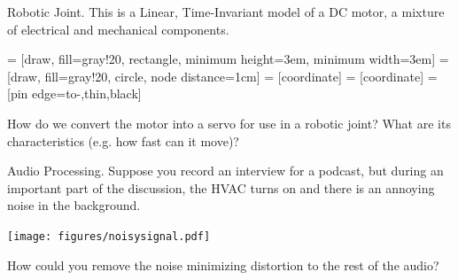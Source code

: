 \begin{example} Robotic Joint. This is a Linear, Time-Invariant model of a DC motor, a mixture of electrical and mechanical components.

  \begin{center}
     = [draw, fill=gray!20, rectangle, 
      minimum height=3em, minimum width=3em]
     = [draw, fill=gray!20, circle, node distance=1cm]
     = [coordinate]
     = [coordinate]
     = [pin edge={to-,thin,black}]

  \end{center}
  
  How do we convert the motor into a servo for use in a robotic joint? What are its characteristics (e.g. how fast can it move)?
\end{example}

\begin{example} Audio Processing. Suppose you record an interview for a podcast, but during an important part of the discussion, the HVAC turns on and there is an annoying noise in the background.

  \begin{center}
    \texttt{[image: figures/noisysignal.pdf]}
  \end{center}

  How could you remove the noise minimizing distortion to the rest of the audio?
\end{example}

